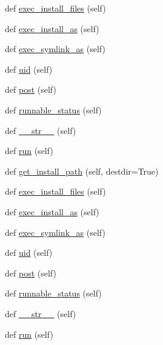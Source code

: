 \begin{DoxyCompactItemize}
def \hyperlink{classwaflib_1_1_build_1_1inst_abf856d52d82ec26f4cc6f76a7c01ac8b}{exec\+\_\+install\+\_\+files} (self)
\item 
def \hyperlink{classwaflib_1_1_build_1_1inst_a0c951c9f7df7638fd030f2b4e1822a62}{exec\+\_\+install\+\_\+as} (self)
\item 
def \hyperlink{classwaflib_1_1_build_1_1inst_adf421fc92d636c0b2380b8fcd1a54de6}{exec\+\_\+symlink\+\_\+as} (self)
\item 
def \hyperlink{classwaflib_1_1_build_1_1inst_af3a833db8b118c295a773017f405de79}{uid} (self)
\item 
def \hyperlink{classwaflib_1_1_build_1_1inst_a747341176f2295022038ca17cf839769}{post} (self)
\item 
def \hyperlink{classwaflib_1_1_build_1_1inst_affb0a840290ad8e000488cc0099950ed}{runnable\+\_\+status} (self)
\item 
def \hyperlink{classwaflib_1_1_build_1_1inst_a32507c568f479fd6409906270834783e}{\+\_\+\+\_\+str\+\_\+\+\_\+} (self)
\item 
def \hyperlink{classwaflib_1_1_build_1_1inst_a0d03fc4440c06aff0a927181771439be}{run} (self)
\item 
def \hyperlink{classwaflib_1_1_build_1_1inst_ac41fdf31d2133d81d941b1bd68ed31f6}{get\+\_\+install\+\_\+path} (self, destdir=True)
\item 
def \hyperlink{classwaflib_1_1_build_1_1inst_abf856d52d82ec26f4cc6f76a7c01ac8b}{exec\+\_\+install\+\_\+files} (self)
\item 
def \hyperlink{classwaflib_1_1_build_1_1inst_a0c951c9f7df7638fd030f2b4e1822a62}{exec\+\_\+install\+\_\+as} (self)
\item 
def \hyperlink{classwaflib_1_1_build_1_1inst_adf421fc92d636c0b2380b8fcd1a54de6}{exec\+\_\+symlink\+\_\+as} (self)
\item 
def \hyperlink{classwaflib_1_1_build_1_1inst_af3a833db8b118c295a773017f405de79}{uid} (self)
\item 
def \hyperlink{classwaflib_1_1_build_1_1inst_a747341176f2295022038ca17cf839769}{post} (self)
\item 
def \hyperlink{classwaflib_1_1_build_1_1inst_affb0a840290ad8e000488cc0099950ed}{runnable\+\_\+status} (self)
\item 
def \hyperlink{classwaflib_1_1_build_1_1inst_a32507c568f479fd6409906270834783e}{\+\_\+\+\_\+str\+\_\+\+\_\+} (self)
\item 
def \hyperlink{classwaflib_1_1_build_1_1inst_a0d03fc4440c06aff0a927181771439be}{run} (self)
\item 

\end{DoxyCompactItemize}
